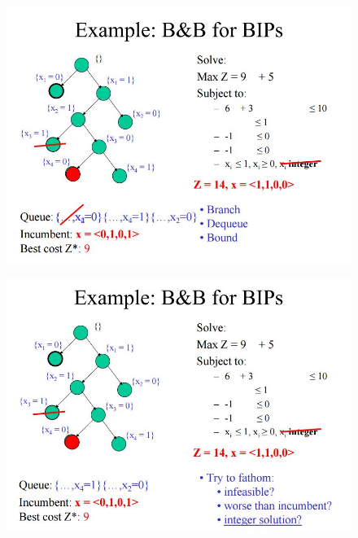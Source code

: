 \documentclass{beamer}
\begin{document}
\begin{frame}
	\begin{figure}
		\centering
		\includegraphics[width=1.0\linewidth]{BB-BIP/BB-BIP23}
	\end{figure}
\end{frame}
\begin{frame}
	\begin{figure}
		\centering
		\includegraphics[width=1.1\linewidth]{BB-BIP/BB-BIP24}
	\end{figure}
\end{frame}
\end{document}
